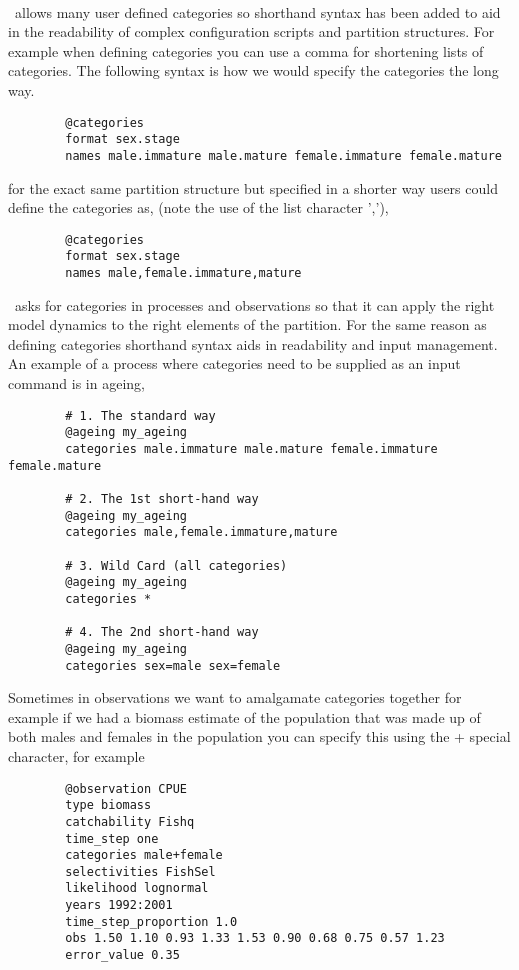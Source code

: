\paragraph*{\label{sub:categories}}
\CNAME\ allows many user defined categories so shorthand syntax has been added to aid in the readability of complex configuration scripts and partition structures. For example when defining categories you can use a comma for shortening lists of categories. The following syntax is how we would specify the categories the long way.
{\small{\begin{verbatim}
		@categories 
		format sex.stage
		names male.immature male.mature female.immature female.mature		
		\end{verbatim}}}	

for the exact same partition structure but specified in a shorter way users could define the categories as, (note the use of the list character ','),

{\small{\begin{verbatim}
		@categories 
		format sex.stage
		names male,female.immature,mature	
		\end{verbatim}}}

\CNAME\ asks for categories in processes and observations so that it can apply the right model dynamics to the right elements of the partition. For the same reason as defining categories shorthand syntax aids in readability and input management. An example of a process where categories need to be supplied as an input command is in ageing,

{\small{\begin{verbatim}
		# 1. The standard way
		@ageing my_ageing
		categories male.immature male.mature female.immature female.mature
		
		# 2. The 1st short-hand way
		@ageing my_ageing
		categories male,female.immature,mature
		
		# 3. Wild Card (all categories)
		@ageing my_ageing
		categories *
		
		# 4. The 2nd short-hand way
		@ageing my_ageing
		categories sex=male sex=female
		\end{verbatim}}}

Sometimes in observations we want to amalgamate categories together for example if we had a biomass estimate of the population that was made up of both males and females in the population you can specify this using the + special character, for example

{\small{\begin{verbatim}
		@observation CPUE
		type biomass
		catchability Fishq
		time_step one
		categories male+female
		selectivities FishSel
		likelihood lognormal
		years 1992:2001
		time_step_proportion 1.0
		obs 1.50 1.10 0.93 1.33 1.53 0.90 0.68 0.75 0.57 1.23
		error_value 0.35
		\end{verbatim}}}

